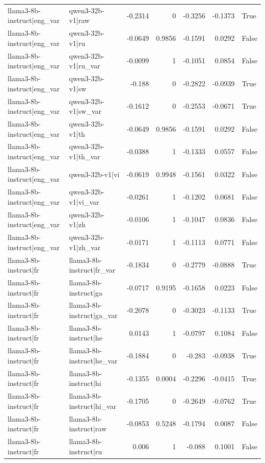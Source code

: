 \begin{table}
\begin{tabular}{l l r r r r l}
llama3-8b-instruct|eng_var & qwen3-32b-v1|raw & -0.2314 & 0 & -0.3256 & -0.1373 & True \\
llama3-8b-instruct|eng_var & qwen3-32b-v1|ru & -0.0649 & 0.9856 & -0.1591 & 0.0292 & False \\
llama3-8b-instruct|eng_var & qwen3-32b-v1|ru_var & -0.0099 & 1 & -0.1051 & 0.0854 & False \\
llama3-8b-instruct|eng_var & qwen3-32b-v1|sw & -0.188 & 0 & -0.2822 & -0.0939 & True \\
llama3-8b-instruct|eng_var & qwen3-32b-v1|sw_var & -0.1612 & 0 & -0.2553 & -0.0671 & True \\
llama3-8b-instruct|eng_var & qwen3-32b-v1|th & -0.0649 & 0.9856 & -0.1591 & 0.0292 & False \\
llama3-8b-instruct|eng_var & qwen3-32b-v1|th_var & -0.0388 & 1 & -0.1333 & 0.0557 & False \\
llama3-8b-instruct|eng_var & qwen3-32b-v1|vi & -0.0619 & 0.9948 & -0.1561 & 0.0322 & False \\
llama3-8b-instruct|eng_var & qwen3-32b-v1|vi_var & -0.0261 & 1 & -0.1202 & 0.0681 & False \\
llama3-8b-instruct|eng_var & qwen3-32b-v1|zh & -0.0106 & 1 & -0.1047 & 0.0836 & False \\
llama3-8b-instruct|eng_var & qwen3-32b-v1|zh_var & -0.0171 & 1 & -0.1113 & 0.0771 & False \\
llama3-8b-instruct|fr & llama3-8b-instruct|fr_var & -0.1834 & 0 & -0.2779 & -0.0888 & True \\
llama3-8b-instruct|fr & llama3-8b-instruct|ga & -0.0717 & 0.9195 & -0.1658 & 0.0223 & False \\
llama3-8b-instruct|fr & llama3-8b-instruct|ga_var & -0.2078 & 0 & -0.3023 & -0.1133 & True \\
llama3-8b-instruct|fr & llama3-8b-instruct|he & 0.0143 & 1 & -0.0797 & 0.1084 & False \\
llama3-8b-instruct|fr & llama3-8b-instruct|he_var & -0.1884 & 0 & -0.283 & -0.0938 & True \\
llama3-8b-instruct|fr & llama3-8b-instruct|hi & -0.1355 & 0.0004 & -0.2296 & -0.0415 & True \\
llama3-8b-instruct|fr & llama3-8b-instruct|hi_var & -0.1705 & 0 & -0.2649 & -0.0762 & True \\
llama3-8b-instruct|fr & llama3-8b-instruct|raw & -0.0853 & 0.5248 & -0.1794 & 0.0087 & False \\
llama3-8b-instruct|fr & llama3-8b-instruct|ru & 0.006 & 1 & -0.088 & 0.1001 & False \\

\end{tabular}
\end{table}
